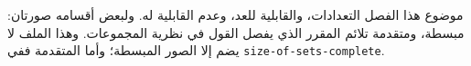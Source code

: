 \documentclass[../../../include/open-logic-chapter]{subfiles}
\begin{document}

\begin{editorial}
موضوع هذا الفصل التعدادات، والقابلية للعد، وعدم القابلية له. ولبعض
أقسامه صورتان: مبسطة، ومتقدمة تلائم المقرر الذي يفصل القول في نظرية
المجموعات. وهذا الملف لا يضم إلا الصور المبسطة؛ وأما المتقدمة ففي
\verb|size-of-sets-complete|.
\end{editorial}











\OLEndChapterHook
\end{document}
